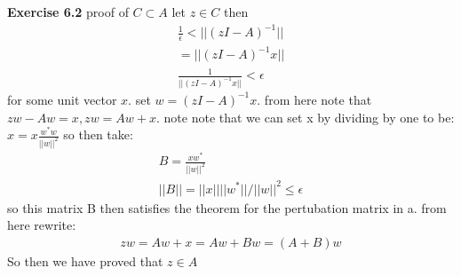\documentclass[12pt]{article}
\newenvironment{exercise}[1]{\vspace{.1in}\noindent\textbf{Exercise #1 \hspace{.05em}}}{}
\theoremstyle{definition}
\theoremstyle{remark}
\begin{document}
\begin{exercise}{6.2}
	proof of $C\subset A$ let $z\in C$ then
	\begin{align}
		\frac{1}{\epsilon}<||(zI-A)^{-1}|| \\
		= ||(zI-A)^{-1}x||                 \\
		\frac{1}{||(zI-A)^{-1}x||}<\epsilon
	\end{align}
	for some unit vector $x$. set $w=(zI-A)^{-1}x$. from here note that $zw-Aw=x,zw=Aw+x$. note note that we can set x by dividing by one to be: $x=x \frac{w^*w}{||w||^2}$ so then take:
	\begin{align}
		B=\frac{xw^*}{||w||^2} \\
		||B||=||x||||w^*||/||w||^2\leq \epsilon
	\end{align}
	so this matrix B then satisfies the theorem for the pertubation matrix in a. from here rewrite:
	\begin{align}
		zw=Aw+x=Aw+Bw=(A+B)w
	\end{align}
	So then we have proved that $z\in A$



\end{exercise}
\end{document}
